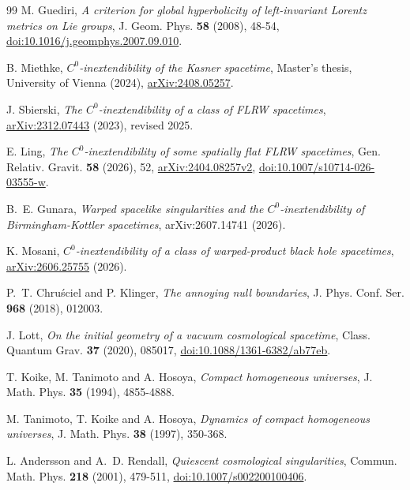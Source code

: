\documentclass[10pt,a4paper]{article}
\numberwithin{equation}{section}
\theoremstyle{definition}
\theoremstyle{remark}
\begin{document}
\begin{thebibliography}{99}
M. Guediri,
\emph{A criterion for global hyperbolicity of left-invariant Lorentz
metrics on Lie groups},
J. Geom. Phys. \textbf{58} (2008), 48-54,
\href{https://doi.org/10.1016/j.geomphys.2007.09.010}
{doi:10.1016/j.geomphys.2007.09.010}.

B. Miethke,
\emph{$C^0$-inextendibility of the Kasner spacetime},
Master's thesis, University of Vienna (2024),
\href{https://arxiv.org/abs/2408.05257}{arXiv:2408.05257}.

J. Sbierski,
\emph{The $C^0$-inextendibility of a class of FLRW spacetimes},
\href{https://arxiv.org/abs/2312.07443}{arXiv:2312.07443} (2023),
revised 2025.

E. Ling,
\emph{The $C^0$-inextendibility of some spatially flat FLRW spacetimes},
Gen. Relativ. Gravit. \textbf{58} (2026), 52,
\href{https://arxiv.org/abs/2404.08257v2}{arXiv:2404.08257v2},
\href{https://doi.org/10.1007/s10714-026-03555-w}
{doi:10.1007/s10714-026-03555-w}.

B.~E. Gunara,
\emph{Warped spacelike singularities and the $C^0$-inextendibility of
Birmingham-Kottler spacetimes},
arXiv:2607.14741 (2026).

K. Mosani,
\emph{$C^0$-inextendibility of a class of warped-product black hole spacetimes},
\href{https://arxiv.org/abs/2606.25755}{arXiv:2606.25755} (2026).

P.~T. Chru\'sciel and P. Klinger,
\emph{The annoying null boundaries},
J. Phys. Conf. Ser. \textbf{968} (2018), 012003.

J. Lott,
\emph{On the initial geometry of a vacuum cosmological spacetime},
Class. Quantum Grav. \textbf{37} (2020), 085017,
\href{https://doi.org/10.1088/1361-6382/ab77eb}
{doi:10.1088/1361-6382/ab77eb}.

T. Koike, M. Tanimoto and A. Hosoya,
\emph{Compact homogeneous universes},
J. Math. Phys. \textbf{35} (1994), 4855-4888.

M. Tanimoto, T. Koike and A. Hosoya,
\emph{Dynamics of compact homogeneous universes},
J. Math. Phys. \textbf{38} (1997), 350-368.

L. Andersson and A.~D. Rendall,
\emph{Quiescent cosmological singularities},
Commun. Math. Phys. \textbf{218} (2001), 479-511,
\href{https://doi.org/10.1007/s002200100406}
{doi:10.1007/s002200100406}.


\end{thebibliography}
\end{document}
